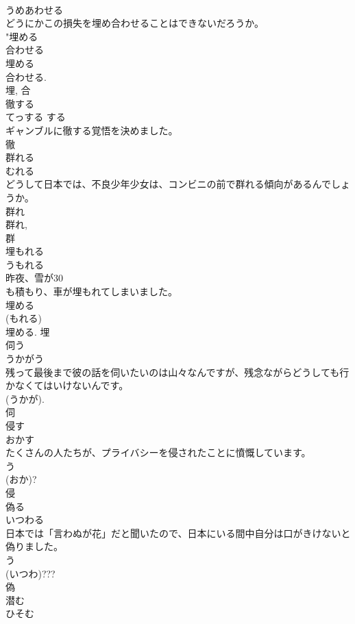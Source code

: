 \documentclass[8pt]{extreport}
\begin{document}
\begin{CJK}{UTF8}{min}
\\	うめあわせる	
\\	どうにかこの損失を埋め合わせることはできないだろうか。	
\\	"埋める 
\\	合わせる 
\\	埋める 
\\	合わせる. 
\\	埋, 合	
\\	徹する	
\\	てっする	する 
\\	ギャンブルに徹する覚悟を決めました。	
\\	徹	
\\	群れる	
\\	むれる	
\\	どうして日本では、不良少年少女は、コンビニの前で群れる傾向があるんでしょうか。	
\\	群れ 
\\	群れ, 
\\	群	
\\	埋もれる	
\\	うもれる	
\\	昨夜、雪が30
\\	も積もり、車が埋もれてしまいました。	
\\	埋める 
\\	(もれる) 
\\	埋める.	埋	
\\	伺う	
\\	うかがう	
\\	残って最後まで彼の話を伺いたいのは山々なんですが、残念ながらどうしても行かなくてはいけないんです。	
\\	(うかが). 
\\	伺	
\\	侵す	
\\	おかす	
\\	たくさんの人たちが、プライバシーを侵されたことに憤慨しています。	
\\	う 
\\	(おか)? 
\\	侵	
\\	偽る	
\\	いつわる	
\\	日本では「言わぬが花」だと聞いたので、日本にいる間中自分は口がきけないと偽りました。	
\\	う 
\\	(いつわ)??? 
\\	偽	
\\	潜む	
\\	ひそむ	

\end{CJK}
\end{document}
